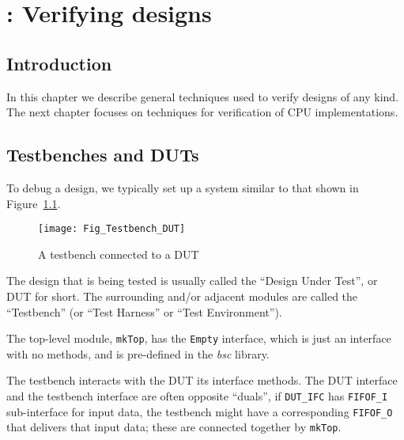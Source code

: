 

\chapter{{\BSV}: Verifying {\BSV} designs}


\setcounter{page}{1}
\renewcommand{\thepage}{\arabic{chapter}-\arabic{page}}

\label{ch_BSV_verification}


\section{Introduction}

In this chapter we describe general techniques used to verify {\BSV}
designs of any kind.  The next chapter focuses on techniques for
verification of CPU implementations.


\section{Testbenches and DUTs}


To debug a {\BSV} design, we typically set up a system similar to that
shown in Figure~\ref{Fig_Testbench_DUT}.
\begin{figure}[htbp]
  \centerline{\texttt{[image: Fig\_Testbench\_DUT]}}
  \caption{\label{Fig_Testbench_DUT}
           A testbench connected to a DUT}
\end{figure}
The {\BSV} design that is being tested is usually called the ``Design
Under Test'', or DUT for short.  The surrounding and/or adjacent
modules are called the ``Testbench'' (or ``Test Harness'' or ``Test
Environment'').

The top-level module, \verb|mkTop|, has the \verb|Empty| interface,
which is just an interface with no methods, and is pre-defined in the
\emph{bsc} library.

The testbench interacts with the DUT {\via} its interface methods.
The DUT interface and the testbench interface are often opposite
``duals'', {\eg} if \verb|DUT_IFC| has \verb|FIFOF_I| sub-interface
for input data, the testbench might have a corresponding
\verb|FIFOF_O| that delivers that input data; these are connected
together by \verb|mkTop|.

